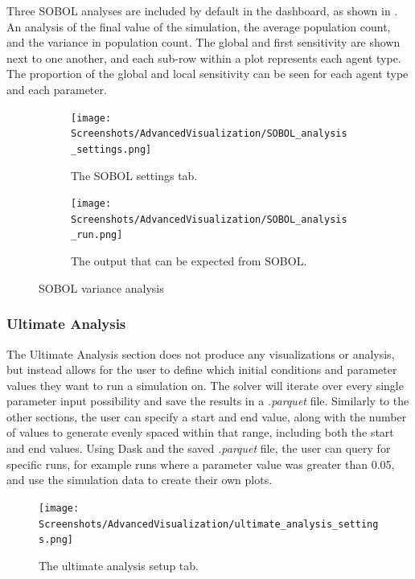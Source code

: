 Three SOBOL analyses are included by default in the dashboard, as shown in .
An analysis of the final value of the simulation, the average population count, and the variance in population count.
The global and first sensitivity are shown next to one another, and each sub-row within a plot represents each agent type. 
The proportion of the global and local sensitivity can be seen for each agent type and each parameter.

\begin{figure}[h!]
    \centering
    \begin{subfigure}{0.49\linewidth}
        \centering
        \vspace*{\fill}
        \texttt{[image: Screenshots/AdvancedVisualization/SOBOL\_analysis\_settings.png]}
        \caption{
            The SOBOL settings tab. 
        }
        \label{fig:ss:av:SOBOL_analysis_settings}
        \vspace*{\fill}
    \end{subfigure}
    \hfill
    \begin{subfigure}{0.49\linewidth}
        \centering
        \vspace*{\fill}
        \texttt{[image: Screenshots/AdvancedVisualization/SOBOL\_analysis\_run.png]}
        \caption{
            The output that can be expected from SOBOL. 
        }
        \label{fig:ss:av:SOBOL_analysis_run}
        \vspace*{\fill}
    \end{subfigure}
    \caption{SOBOL variance analysis}
\end{figure}

\subsubsection{Ultimate Analysis}
\label{sec:ultimate_analysis}
The Ultimate Analysis section does not produce any visualizations or analysis, but instead allows for the user to define which initial conditions and parameter values they want to run a simulation on.
The solver will iterate over every single parameter input possibility and save the results in a \textit{.parquet} file.
Similarly to the other sections, the user can specify a start and end value, along with the number of values to generate evenly spaced within that range, including both the start and end values.
\newline
Using Dask and the saved \textit{.parquet} file, the user can query for specific runs, for example runs where a parameter value was greater than 0.05, and use the simulation data to create their own plots.
\begin{figure}
    \centering
    \texttt{[image: Screenshots/AdvancedVisualization/ultimate\_analysis\_settings.png]}
    \caption{
        The ultimate analysis setup tab. 
    }
    \label{fig:ss:av:ultimate_analysis_settings}
\end{figure}


